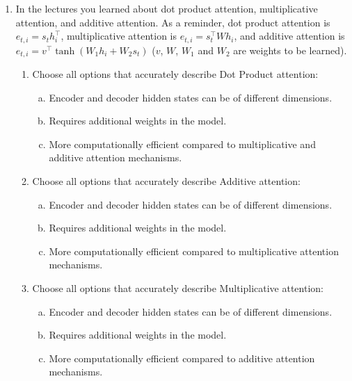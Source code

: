 \begin{enumerate}[1.]
\begin{enumerate}[4a.]

\end{enumerate}

\item

In the lectures you learned about dot product attention, multiplicative attention, and additive attention. As a reminder, dot product attention is $e_{t,i} = s_t h_i^\intercal$, multiplicative attention is $e_{t,i} = s_t^\intercal W h_i$, and additive attention is $e_{t,i} = v^\intercal \tanh(W_1 h_i + W_2 s_t)$  ($v$, $W$, $W_1$ and $W_2$ are weights to be learned).
\begin{enumerate}[5a.]
\item {}

Choose all options that accurately describe Dot Product attention:

\begin{enumerate}[(a)]
\item Encoder and decoder hidden states can be of different dimensions.
\item Requires additional weights in the model.
\item More computationally efficient compared to multiplicative and additive attention mechanisms.
\end{enumerate}


\item {}

Choose all options that accurately describe Additive attention:

\begin{enumerate}[(a))]
\item Encoder and decoder hidden states can be of different dimensions.
\item Requires additional weights in the model.
\item More computationally efficient compared to multiplicative attention mechanisms.
\end{enumerate}


\item {}

Choose all options that accurately describe Multiplicative attention:

\begin{enumerate}[(a)]
\item Encoder and decoder hidden states can be of different dimensions.
\item Requires additional weights in the model.
\item More computationally efficient compared to additive attention mechanisms.
\end{enumerate}

\end{enumerate}
\end{enumerate}